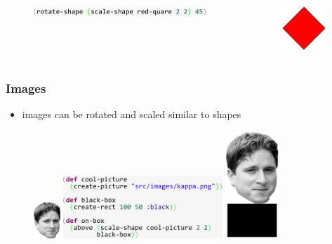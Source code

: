 \documentclass{beamer}
\begin{document}
\begin{frame}[fragile]
\begin{itemize}
		\begin{columns}[t]
		\begin{column}{.45\textwidth}
			\begin{figure}[h]
			\vspace{-0.5cm}
			\includegraphics[width=6.5cm]{PresentationImages/rotateAndScaleRedCode.pdf}
			\end{figure}
		\end{column}
		\begin{column}{.3\textwidth}
			\begin{figure}[h]
			\includegraphics[width=1.7cm]{PresentationImages/red-rectangle-scale-rotate.png}
			\end{figure}		
		\end{column}
		\end{columns}
	\end{itemize}
\end{frame}

\begin{frame}
\frametitle{Images}
	\begin{itemize}
		\item images can be rotated and scaled similar to shapes
	\end{itemize}
	\begin{figure}
		\vspace{0.2cm}
		\includegraphics[width=1cm]{PresentationImages/kappa96x130.png}
		\hspace{0.4cm}
		\includegraphics[width=6cm]{PresentationImages/pictureOnBoxCode.pdf}
		\hspace{0.4cm}
		\includegraphics[width=2cm]{PresentationImages/onBoxKappa.pdf}
	\end{figure}
\end{frame}
\end{document}
